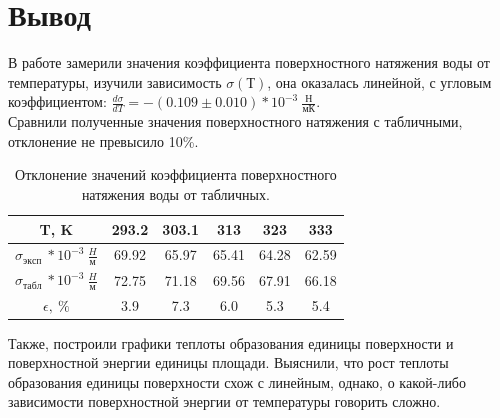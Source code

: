 \documentclass[a4paper, 12pt]{article}%
\begin{document}
	\section{Вывод}
	В работе замерили значения коэффициента поверхностного натяжения воды от температуры, изучили зависимость $\sigma(Т)$, она оказалась линейной, с угловым коэффициентом:  $\frac{d\sigma}{dT} = -(0.109\pm 0.010) * 10^{-3}~\frac{Н}{мК}$.\\
	Сравнили полученные значения поверхностного натяжения с табличными, отклонение не превысило 10\%.\\
	\begin{table}[H]
		\centering
		\begin{tabular}{|c|c|c|c|c|c|}
			\hline
			T, K    & 293.2 & 303.1 & 313   & 323   & 333   \\ \hline
			$\sigma_{эксп}~ *10^{-3} ~\frac{H}{м}$    & 69.92 & 65.97 & 65.41 & 64.28 & 62.59 \\ \hline
			$\sigma_{табл}~ *10^{-3} ~\frac{H}{м}$   & 72.75 & 71.18 & 69.56 & 67.91 & 66.18 \\ \hline
			$\epsilon, ~\%$ & 3.9   & 7.3   & 6.0   & 5.3   & 5.4   \\ \hline
		\end{tabular}
		\caption{Отклонение значений коэффициента поверхностного натяжения воды от табличных.}
	\end{table}
	Также, построили графики теплоты образования единицы поверхности и поверхностной энергии единицы площади. Выяснили, что рост теплоты образования единицы поверхности схож с линейным, однако, о какой-либо зависимости поверхностной энергии от температуры говорить сложно.
\end{document}
